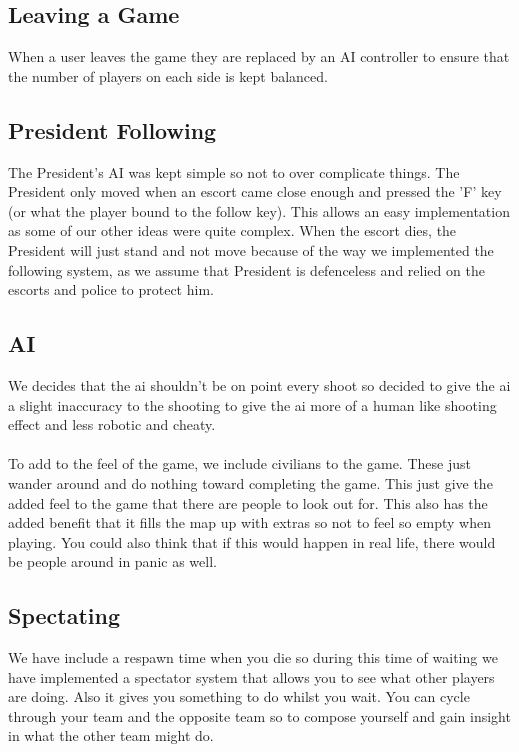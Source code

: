 \documentclass[12pt]{article}
\newcommand{\return}{\\\\\noindent}
\begin{document}
\subsection{Leaving a Game}
When a user leaves the game they are replaced by an AI controller to ensure that the number of players on each side is kept balanced.
\subsection{President Following}
The President's AI was kept simple so not to over complicate things. The President only moved when an escort came close enough and pressed the 'F' key (or what the player bound to the follow key). This allows an easy implementation as some of our other ideas were quite complex. When the escort dies, the President will just stand and not move because of the way we implemented the following system, as we assume that President is defenceless and relied on the escorts and police to protect him.
\subsection{AI}
We decides that the ai shouldn’t be on point every shoot so decided to give the ai a slight inaccuracy to the shooting to give the ai more of a human like shooting effect and less robotic and cheaty.\return
To add to the feel of the game, we include civilians to the game. These just wander around and do nothing toward completing the game. This just give the added feel to the game that there are people to look out for. This also has the added benefit that it fills the map up with extras so not to feel so empty when playing. You could also think that if this would happen in real life, there would be people around in panic as well.
\subsection{Spectating}
We have include a respawn time when you die so during this time of waiting we have implemented a spectator system that allows you to see what other players are doing. Also it gives you something to do whilst you wait. You can cycle through your team and the opposite team so to compose yourself and gain insight in what the other team might do.
\newpage
\end{document}
